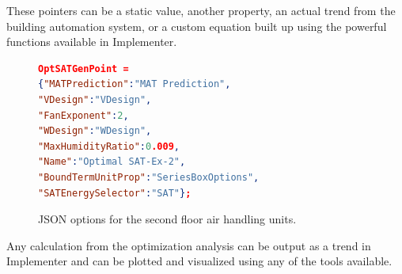 These pointers can be a static value, another property, an actual
trend from the building automation system, or a custom equation built up
using the powerful functions available in Implementer.

\begin{figure}
\centering
\begin{lstlisting}[language=json]
OptSATGenPoint = 
{"MATPrediction":"MAT Prediction",
"VDesign":"VDesign",
"FanExponent":2,
"WDesign":"WDesign",
"MaxHumidityRatio":0.009,
"Name":"Optimal SAT-Ex-2",
"BoundTermUnitProp":"SeriesBoxOptions",
"SATEnergySelector":"SAT"};
\end{lstlisting}
\caption{JSON options for the second floor air handling units. }
\label{fig:JSONOptions}
\end{figure}

Any calculation from the optimization analysis can be output as a trend
in Implementer and can be plotted and visualized using any of the tools
available. 






